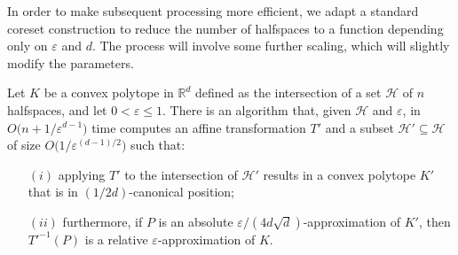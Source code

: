 \documentclass[11pt]{article}   \usepackage[letterpaper,hmargin=2.1cm,vmargin=3cm]{geometry}
\newcommand{\RE}{\mathbb{R}}    \newcommand{\ZZ}{\mathbb{Z}}    \newcommand{\eps}{\varepsilon}  \newcommand{\ST}{\,:\,}         \newcommand{\sq}{\square}
\begin{document}
In order to make subsequent processing more efficient, we adapt a standard coreset construction to reduce the number of halfspaces to a function depending only on $\eps$ and $d$. The process will involve some further scaling, which will slightly modify the parameters.

\begin{lemma} \label{lem:precondition-2}
Let $K$ be a convex polytope in $\RE^d$ defined as the intersection of a set $\mathcal{H}$ of $n$ halfspaces, and let $0 < \eps \le 1$. There is an algorithm that, given $\mathcal{H}$ and $\eps$, in $O\big(n + 1/\eps^{d-1}\big)$ time computes an affine transformation $T'$ and a subset $\mathcal{H}' \subseteq \mathcal{H}$ of size $O\big(1/\eps^{(d-1)/2}\big)$ such that: 
\begin{enumerate}
\setlength{\itemsep}{-0.5ex}\setlength{\parsep}{0pt}\item[$(i)$] applying $T'$ to the intersection of $\mathcal{H}'$ results in a convex polytope $K'$ that is in $(1/2d)$-canonical position;

\item[$(ii)$] furthermore, if $P$ is an absolute $\eps/(4 d \sqrt{d})$-approximation of $K'$, then ${T'}^{-1}(P)$ is a relative $\eps$-approximation of $K$.
\end{enumerate}
\end{lemma}
\end{document}
